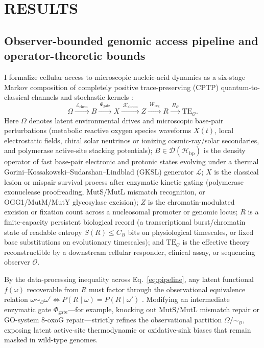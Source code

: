\documentclass[10pt,letterpaper]{article}
\theoremstyle{plain}
\theoremstyle{definition}
\newcommand{\Lcal}{\mathcal{L}}
\newcommand{\Hcal}{\mathcal{H}}
\newcommand{\oxog}{\text{8-oxoG}}
\begin{document}
\section*{RESULTS}

\subsection*{Observer-bounded genomic access pipeline and operator-theoretic bounds}

I formalize cellular access to microscopic nucleic-acid dynamics as a six-stage Markov composition of completely positive trace-preserving (CPTP) quantum-to-classical channels and stochastic kernels \cite{garcia2026observer,garcia2026memory,garcia2026quantumlike}:
\begin{equation}
    \Omega \xrightarrow{\;\mathcal{E}_{\mathrm{chem}}\;} B \xrightarrow{\;\Phi_{\mathrm{gate}}\;} X \xrightarrow{\;\mathcal{K}_{\mathrm{chrom}}\;} Z \xrightarrow{\;\mathcal{W}_{\mathrm{reg}}\;} R \xrightarrow{\;\Pi_{\mathcal{O}}\;} \mathrm{TE}_{\mathcal{O}}.
    \label{eq:pipeline}
\end{equation}
Here $\Omega$ denotes latent environmental drives and microscopic base-pair perturbations (metabolic reactive oxygen species waveforms $X(t)$, local electrostatic fields, chiral solar neutrinos or ionizing cosmic-ray/solar secondaries, and polymerase active-site stacking potentials); $B \in \mathcal{D}(\Hcal_{\mathrm{bp}})$ is the density operator of fast base-pair electronic and protonic states evolving under a thermal Gorini--Kossakowski--Sudarshan--Lindblad (GKSL) generator $\Lcal$; $X$ is the classical lesion or mispair survival process after enzymatic kinetic gating (polymerase exonuclease proofreading, MutS/MutL mismatch recognition, or OGG1/MutM/MutY glycosylase excision); $Z$ is the chromatin-modulated excision or fixation count across a nucleosomal promoter or genomic locus; $R$ is a finite-capacity persistent biological record (a transcriptional burst/chromatin state of readable entropy $S(R) \le C_B$ bits on physiological timescales, or fixed base substitutions on evolutionary timescales); and $\mathrm{TE}_{\mathcal{O}}$ is the effective theory reconstructible by a downstream cellular responder, clinical assay, or sequencing observer $\mathcal{O}$.

By the data-processing inequality across Eq.~\eqref{eq:pipeline}, any latent functional $f(\omega)$ recoverable from $R$ must factor through the observational equivalence relation $\omega \sim_{\mathcal{O}} \omega' \iff P(R \mid \omega) = P(R \mid \omega')$ \cite{garcia2026observer}. Modifying an intermediate enzymatic gate $\Phi_{\mathrm{gate}}$---for example, knocking out MutS/MutL mismatch repair or GO-system $\oxog$ repair---strictly refines the observational partition $\Omega / {\sim_{\mathcal{O}}}$, exposing latent active-site thermodynamic or oxidative-sink biases that remain masked in wild-type genomes.
\end{document}
